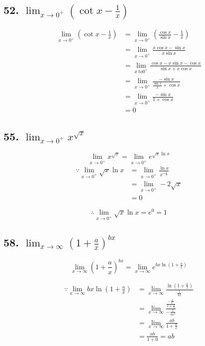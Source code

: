\documentclass{article}
\begin{document}
    \subsection*{52. $\lim_{x \to 0^+}(\cot x - \frac 1 x)$}

    $$\begin{aligned}
        \lim_{x \to 0^+}(\cot x - \frac 1 x) &= \lim_{x \to 0^+}(\frac{\cos x}{\sin x} - \frac 1 x) \\
        &= \lim_{x \to 0^+}\frac{x \cos x - \sin x}{x \sin x} \\
        &= \lim_{x\ to 0^+}\frac{\cos x - x \sin x - \cos x}{\sin x + x \cos x} \\
        &= \lim_{x \to 0^+}\frac{-\sin x}{\frac{\sin x}{x} + \cos x} \\
        &= \lim_{x \to 0^+}\frac{-\sin x}{1 + \cos x} \\
        &= 0
    \end{aligned}$$

    \subsection*{55. $\lim_{x \to 0^+}x^{\sqrt x}$}
    
        $$\lim_{x \to 0^+}x^{\sqrt x} = \lim_{x \to 0^+}e^{\sqrt{x} \ln x} $$
    $$\begin{aligned}
        \because \lim_{x \to 0^+} \sqrt{x} \ln x &= \lim_{x \to 0^+}\frac{\ln x}{x^{-\frac 1 2}} \\
        &= \lim_{x \to 0^+}-2\sqrt{x} \\
        &= 0
    \end{aligned}$$

    $$\therefore \lim_{x \to 0^+}\sqrt x \ln x = e^0 = 1$$

    \subsection*{58. $\lim_{x \to \infty}(1 + \frac a x)^{bx}$}

    $$\lim_{x \to \infty}(1 + \frac a x)^{bx} = \lim_{x \to \infty} e^{ bx \ln (1 + \frac a x)} $$

    $$\begin{aligned}
        \because \lim_{x \to \infty}bx \ln (1 + \frac a x) &= \lim_{x \to \infty}\frac{\ln (1 + \frac a x)}{\frac{1}{bx}} \\
        &= \lim_{x \to \infty}\frac{\frac{-\frac{a}{x^2}}{1 + \frac a x}}{-\frac{1}{bx^2}} \\
        &= \lim_{x \to \infty}\frac{ab}{1 + \frac a x} \\
        &= \frac{ab}{1 + 0} = ab
    \end{aligned}$$
\end{document}

